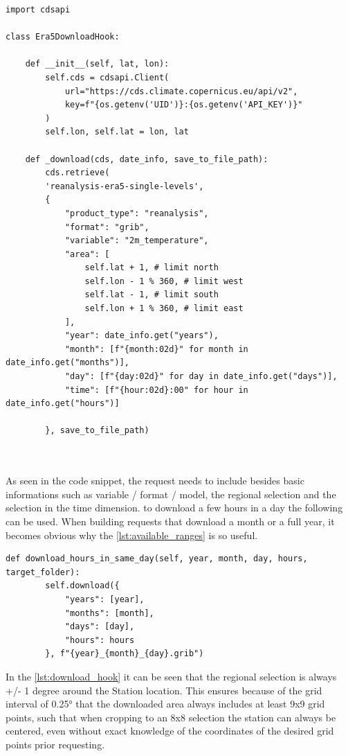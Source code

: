 \begin{lstlisting}[caption=Download Hook for ERA5 Data, label=lst:download_hook]
import cdsapi

class Era5DownloadHook:
    
    def __init__(self, lat, lon):
        self.cds = cdsapi.Client(
            url="https://cds.climate.copernicus.eu/api/v2",
            key=f"{os.getenv('UID')}:{os.getenv('API_KEY')}"
        )
        self.lon, self.lat = lon, lat

    def _download(cds, date_info, save_to_file_path):
        cds.retrieve(
        'reanalysis-era5-single-levels',
        {
            "product_type": "reanalysis",
            "format": "grib",
            "variable": "2m_temperature",
            "area": [
                self.lat + 1, # limit north
                self.lon - 1 % 360, # limit west
                self.lat - 1, # limit south
                self.lon + 1 % 360, # limit east
            ],
            "year": date_info.get("years"),
            "month": [f"{month:02d}" for month in date_info.get("months")],
            "day": [f"{day:02d}" for day in date_info.get("days")],
            "time": [f"{hour:02d}:00" for hour in date_info.get("hours")]

        }, save_to_file_path)



\end{lstlisting}

As seen in the code snippet, the request needs to include besides basic informations such as variable / format / model, the regional selection and the selection in the time dimension.
to download a few hours in a day the following can be used.
When building requests that download a month or a full year, it becomes obvious why the \autoref{lst:available_ranges} is so useful.

\begin{lstlisting}[caption=Download Hours in Same Day in Download Hook Class, label=lst:download_hours_in_same_day]
    def download_hours_in_same_day(self, year, month, day, hours, target_folder):
        self.download({
            "years": [year],
            "months": [month],
            "days": [day],
            "hours": hours
        }, f"{year}_{month}_{day}.grib")
\end{lstlisting}

In the \autoref{lst:download_hook} it can be seen that the regional selection is always +/- 1 degree around the Station location.
This ensures because of the grid interval of 0.25° that the downloaded area always includes at least 9x9 grid points, such that when cropping to an 8x8 selection the station can always be centered, even without exact knowledge of the coordinates of the desired grid points prior requesting. 



